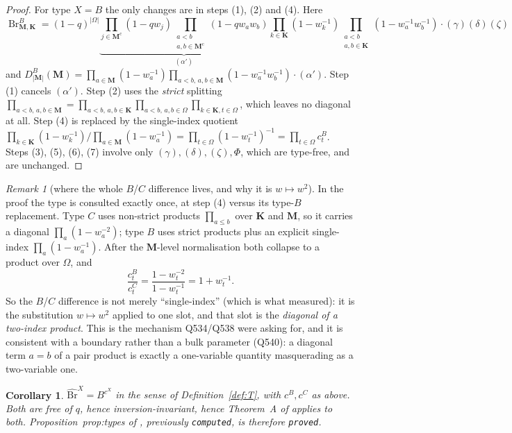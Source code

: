 \documentclass[11pt]{article}
\theoremstyle{plain}
\newtheorem{cor}[thm]{Corollary}
\theoremstyle{definition}
\theoremstyle{remark}
\newtheorem{rem}[thm]{Remark}
\newcommand{\bM}{\mathbf M}
\newcommand{\bK}{\mathbf K}
\newcommand{\cm}{{\mathrm c}}
\newcommand{\Br}{\operatorname{Br}}
\newcommand{\Bh}{\widehat{\mathrm{Br}}}
\newcommand{\Om}{\Omega}
\begin{document}
\begin{proof}
For type $X=B$ the only changes are in steps (1), (2) and (4). Here
\[
\Br^B_{\bM,\bK}=(1-q)^{|\Om|}
\underbrace{\prod_{j\in\bM^\cm}\!(1-qw_j)\!\!\prod_{\substack{a<b\\a,b\in\bM^\cm}}\!\!(1-qw_aw_b)}_{(\alpha')}
\prod_{k\in\bK}(1-w_k^{-1})\!\!\prod_{\substack{a<b\\a,b\in\bK}}\!\!(1-w_a^{-1}w_b^{-1})
\cdot(\gamma)(\delta)(\zeta)
\]
and
$D^B_{|\bM|}(\bM)=\prod_{a\in\bM}(1-w_a^{-1})\prod_{a<b,\,a,b\in\bM}(1-w_a^{-1}w_b^{-1})\cdot(\alpha')$.
Step (1) cancels $(\alpha')$. Step (2) uses the \emph{strict} splitting
$\prod_{a<b,\,a,b\in\bM}=\prod_{a<b,\,a,b\in\bK}\prod_{a<b,\,a,b\in\Om}\prod_{k\in\bK,t\in\Om}$,
which leaves no diagonal at all. Step (4) is replaced by the single-index quotient
$\prod_{k\in\bK}(1-w_k^{-1})/\prod_{a\in\bM}(1-w_a^{-1})=\prod_{t\in\Om}(1-w_t^{-1})^{-1}
=\prod_{t\in\Om}c^B_t$.
Steps (3), (5), (6), (7) involve only $(\gamma),(\delta),(\zeta),\Phi$, which are
type-free, and are unchanged.
\end{proof}

\begin{rem}[where the whole $B$/$C$ difference lives, and why it is $w\mapsto w^2$]
\label{rem:diag}
In the proof the type is consulted exactly once, at step (4) versus its type-$B$
replacement. Type $C$ uses non-strict products $\prod_{a\le b}$ over $\bK$ and
$\bM$, so it carries a diagonal $\prod_a(1-w_a^{-2})$; type $B$ uses strict
products plus an explicit single-index $\prod_a(1-w_a^{-1})$. After the $\bM$-level
normalisation both collapse to a product over $\Om$, and
\[
\frac{c^B_t}{c^C_t}=\frac{1-w_t^{-2}}{1-w_t^{-1}}=1+w_t^{-1}.
\]
So the $B$/$C$ difference is not merely ``single-index'' (which is what
\cite{ClioA} measured): it is the substitution $w\mapsto w^2$ applied to one slot,
and that slot is the \emph{diagonal of a two-index product}. This is the mechanism
Q534/Q538 were asking for, and it is consistent with a boundary rather than a bulk
parameter (Q540): a diagonal term $a=b$ of a pair product is exactly a one-variable
quantity masquerading as a two-variable one.
\end{rem}

\begin{cor}
\label{cor:types}
$\Bh^X=B^{c^X}$ in the sense of Definition~\ref{def:T}, with $c^B,c^C$ as above.
Both are free of $q$, hence inversion-invariant, hence Theorem~A of \cite{ClioA}
applies to both. Proposition~\textup{prop:types} of \cite{ClioA}, previously
\texttt{computed}, is therefore \texttt{proved}.
\end{cor}
\end{document}
